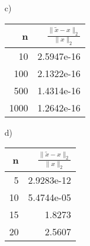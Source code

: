 \documentclass[a4paper]{scrartcl}
\begin{document}
\begin{aufgabe}
	\begin{enumerate}
		\item[c)]
			\begin{tabular}{r|r}
				n & $\frac{\|\tilde x-x\|_2}{\|x\|_2}$\\
				\hline
				10 & 2.5947e-16\\
			   100 & 2.1322e-16\\
				   500& 1.4314e-16\\
				  1000& 1.2642e-16
			\end{tabular}
		\item[d)]
			\begin{tabular}{r|r}
				n & $\frac{\|\tilde x-x\|_2}{\|x\|_2}$\\
				\hline
				5 & 2.9283e-12\\
				10& 5.4744e-05\\
				15& 1.8273\\
				20& 2.5607
			\end{tabular}
	\end{enumerate}

\end{aufgabe}
\end{document}
